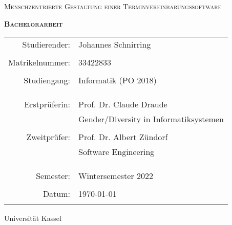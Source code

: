 \documentclass[12pt]{article}
\title{\thesisTitle}
\author{Johannes Schnirring}
\newcommand{\thesisTitle}{Menschzentrierte Gestaltung einer Terminvereinbarungssoftware}
\begin{document}
\begin{titlepage}
    \centering
    {\scshape\Huge \thesisTitle \par}
    \vspace{1cm}
    {\scshape\Large \textbf{Bachelorarbeit}\par}
    \vspace{1.5cm}
    \begin{tabular}{r l}
        {\Large Studierender:}   & {\Large Johannes Schnirring}                     \\ \\
        {\Large Matrikelnummer:} & {\Large 33422833}                                \\ \\
        {\Large Studiengang:}    & {\Large Informatik (PO 2018) }                   \\ \\ \\ \\
        {\Large Erstprüferin:}   & {\Large Prof. Dr. Claude Draude }                \\
                                 & {\Large Gender/Diversity in Informatiksystemen } \\ \\
        {\Large Zweitprüfer:}    & {\Large Prof. Dr. Albert Zündorf }               \\
                                 & {\Large Software Engineering }                   \\ \\ \\ \\
        {\Large Semester:}       & {\Large Wintersemester 2022}                     \\ \\
        {\Large Datum:}          & {\Large \today}                                  \\ \\
    \end{tabular}
    \vfill
    {\large Universität Kassel}
\end{titlepage}
\end{document}
